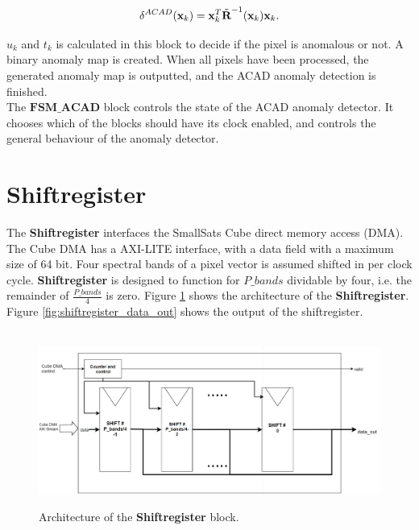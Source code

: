 \begin{equation}
    \delta^{ACAD}(\textbf{x}_k)= \textbf{x}_k^T\Tilde{\textbf{R}}^{-1}(\textbf{x}_k)\textbf{x}_k.
    \label{eq:ACAD_2}
\end{equation}

$u_k$ and $t_k$ is calculated in this block to decide if the pixel is anomalous or not. A binary anomaly map is created. When all pixels have been processed, the generated anomaly map is outputted, and the ACAD anomaly detection is finished.   
\\

The $\textbf{FSM\_ACAD}$ block controls the state of the ACAD anomaly detector. It chooses which of the blocks should have its clock enabled, and controls the general behaviour of the anomaly detector. 







\section{Shiftregister}
The \textbf{Shiftregister} interfaces the SmallSats Cube direct memory access (DMA). The Cube DMA has a AXI-LITE interface, with a data field with a maximum size of 64 bit. Four spectral bands of a pixel vector is assumed shifted in per clock cycle. \textbf{Shiftregister} is designed to function for $P\_bands$ dividable by four, i.e. the remainder of $\frac{P\_bands}{4}$ is zero. 
Figure \ref{fig:shiftregister_architecture} shows the architecture of the \textbf{Shiftregister}. Figure \ref{fig:shiftregister_data_out} shows the output of the shiftregister. 

\begin{figure}[H]
\centering
\hbox{\hspace*{-1.2cm}             
   \includegraphics[scale=0.5]{images/shiftregister.png}}
  \caption{Architecture of the \textbf{Shiftregister} block. } 
  \label{fig:shiftregister_architecture}
\end{figure}


